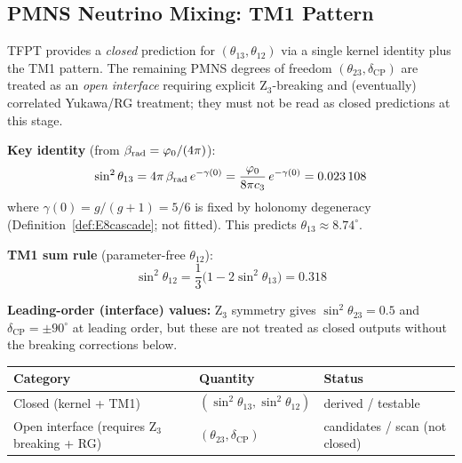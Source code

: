 \subsection{PMNS Neutrino Mixing: TM1 Pattern}

\begin{tcolorbox}[colback=blue!3, colframe=blue!50!black, 
    title={\textbf{PMNS: closed sub-block vs.\ open interface}}, fonttitle=\bfseries]
TFPT provides a \emph{closed} prediction for $(\theta_{13},\theta_{12})$ via a single kernel identity plus the TM1 pattern. The remaining PMNS degrees of freedom $(\theta_{23},\delta_{\mathrm{CP}})$ are treated as an \emph{open interface} requiring explicit Z$_3$-breaking and (eventually) correlated Yukawa/RG treatment; they must not be read as closed predictions at this stage.

\textbf{Key identity} (from $\beta_{\text{rad}} = \phiz/(4\pi)$):
\begin{equation}
    \sin^2\theta_{13} = 4\pi\,\beta_{\text{rad}}\, e^{-\gamma(0)} 
    = \frac{\phiz}{8\pi\cthree}\, e^{-\gamma(0)} = \num[round-mode=places,round-precision=6]{\TFPTsinSqThetaThirteen}
\end{equation}
where $\gamma(0)=g/(g+1)=5/6$ is fixed by holonomy degeneracy (Definition~\ref{def:E8cascade}; not fitted). 
This predicts $\theta_{13} \approx 8.74^\circ$.

\textbf{TM1 sum rule} (parameter-free $\theta_{12}$):
\begin{equation}
    \sin^2\theta_{12} = \frac{1}{3}\bigl(1 - 2\sin^2\theta_{13}\bigr) = 0.318
\end{equation}

\textbf{Leading-order (interface) values:} Z$_3$ symmetry gives $\sin^2\theta_{23}=0.5$ and $\delta_{\mathrm{CP}}=\pm 90^\circ$ at leading order, but these are not treated as closed outputs without the breaking corrections below.

\medskip
\begin{center}
\begin{tabular}{@{}lll@{}}
\toprule
\textbf{Category} & \textbf{Quantity} & \textbf{Status}\\
\midrule
Closed (kernel + TM1) & $(\sin^2\theta_{13},\sin^2\theta_{12})$ & derived / testable\\
Open interface (requires Z$_3$ breaking + RG) & $(\theta_{23},\delta_{\mathrm{CP}})$ & candidates / scan (not closed)\\
\bottomrule
\end{tabular}
\end{center}


\end{tcolorbox}
